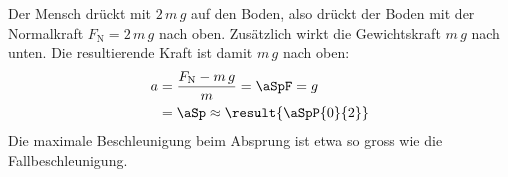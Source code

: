 Der Mensch drückt mit $2\,m\,g$ auf den Boden, also drückt der Boden mit der Normalkraft $F_\text{N} = 2\,m\,g$ nach oben. Zusätzlich wirkt die Gewichtskraft $m\,g$ nach unten. Die resultierende Kraft ist damit $m\,g$ nach oben:
\begin{align}
 a &= \frac{F_\text{N}-m\,g}{m} = \aSpF = g \\
   &= \aSp \approx \result{\aSpP{0}{2}}
\end{align}
Die maximale Beschleunigung beim Absprung ist etwa so gross wie die Fallbeschleunigung.
